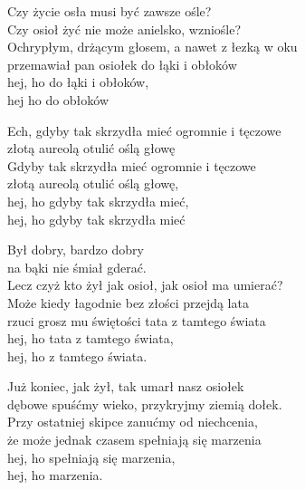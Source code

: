 \begin{text}
    Czy życie osła musi być zawsze ośle?\\
    Czy osioł żyć nie może anielsko, wzniośle?\\
    Ochrypłym, drżącym głosem, a nawet z łezką w oku\\
    przemawiał pan osiołek do łąki i obłoków\\
    hej, ho do łąki i obłoków,\\
    hej ho do obłoków

    Ech, gdyby tak skrzydła mieć ogromnie i tęczowe\\
    złotą aureolą otulić oślą głowę\\
    Gdyby tak skrzydła mieć ogromnie i tęczowe\\
    złotą aureolą otulić oślą głowę,\\
    hej, ho gdyby tak skrzydła mieć,\\
    hej, ho gdyby tak skrzydła mieć

    Był dobry, bardzo dobry\\
    na bąki nie śmiał gderać.\\
    Lecz czyż kto żył jak osioł, jak osioł ma umierać?\\
    Może kiedy łagodnie bez złości przejdą lata\\
    rzuci grosz mu świętości tata z tamtego świata\\
    hej, ho tata z tamtego świata,\\
    hej, ho z tamtego świata.

    Już koniec, jak żył, tak umarł nasz osiołek\\
    dębowe spuśćmy wieko, przykryjmy ziemią dołek.\\
    Przy ostatniej skipce zanućmy od niechcenia,\\
    że może jednak czasem spełniają się marzenia\\
    hej, ho spełniają się marzenia,\\
    hej, ho marzenia.
\end{text}
